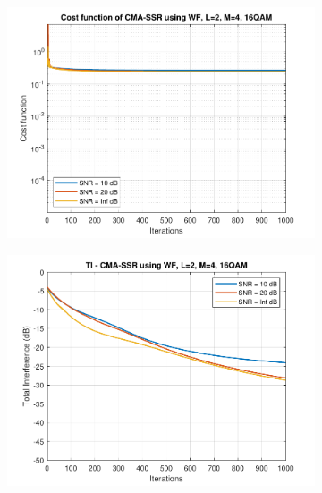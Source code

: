 \begin{figure}
\begin{subfigure}[b]{0.45\textwidth}
		\includegraphics[width=\linewidth]{./figs/BF_WF_cost_16QAM_L=2_M=4_K=1000.pdf}
		\label{fig:wf_cost16}
	\end{subfigure}
	\begin{subfigure}[b]{0.45\textwidth}
		\includegraphics[width=\linewidth]{./figs/BF_WF_TI_16QAM_L=2_M=4_K=1000.pdf}
		\label{fig:wf_ti16}
	\end{subfigure}
	\begin{subfigure}[b]{0.45\textwidth}

\end{subfigure}
\end{figure}
